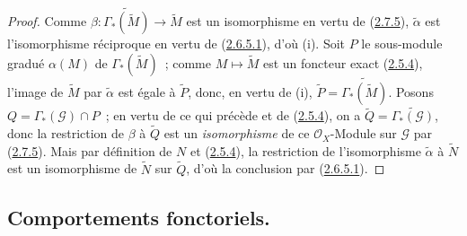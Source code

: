 \begin{proof}
Comme $\beta:\widetilde{\Gamma_*(\widetilde{M})}
\to\widetilde{M}$ est un isomorphisme en vertu de
(\hyperref[II.2.7.5-fr]{2.7.5}), $\widetilde{\alpha}$ est l'isomorphisme
réciproque en vertu de (\hyperref[II.2.6.5.1-fr]{2.6.5.1}), d'où (i). Soit
$P$ le sous-module gradué $\alpha(M)$ de $\Gamma_*(\widetilde{M})$~; comme
$M\mapsto\widetilde{M}$ est un foncteur exact
(\hyperref[II.2.5.4-fr]{2.5.4}), l'image de $\widetilde{M}$ par
$\widetilde{\alpha}$ est égale à $\widetilde{P}$, donc, en vertu de (i),
$\widetilde{P}=\widetilde{\Gamma_*(\widetilde{M})}$. Posons
$Q=\Gamma_*(\mathcal{G})\cap P$~; en vertu de ce qui précède et de
(\hyperref[II.2.5.4-fr]{2.5.4}), on a
$\widetilde{Q}=\widetilde{\Gamma_*(\mathcal{G})}$, donc la
restriction de $\beta$ à $\widetilde{Q}$ est un \emph{isomorphisme} de ce
$\mathcal{O}_X$-Module sur $\mathcal{G}$ par
(\hyperref[II.2.7.5-fr]{2.7.5}). Mais par définition de $N$ et
(\hyperref[II.2.5.4-fr]{2.5.4}), la restriction de l'isomorphisme
$\widetilde{\alpha}$ à $\widetilde{N}$ est un isomorphisme de $\widetilde{N}$
sur $\widetilde{Q}$, d'où la conclusion par
(\hyperref[II.2.6.5.1-fr]{2.6.5.1}).
\end{proof}

\subsection{Comportements fonctoriels.}
\label{subsection:II.2.8-fr}


